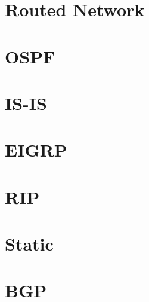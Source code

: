 \section{Routed Network}

\section{OSPF}
\section{IS-IS}
\section{EIGRP}
\section{RIP}
\section{Static}
\section{BGP}

